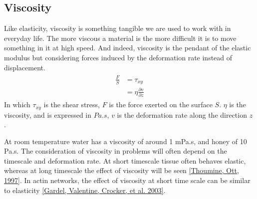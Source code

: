 \documentclass[A4paperpaper,11pt,english]{sphinxmanual}
\begin{document}
\subsection{Viscosity}
\label{index-latex:viscosity}
Like elasticity, viscosity is something tangible we are used to work with in
everyday life. The more viscous a material is the more difficult it is to move
something in it at high speed. And indeed, viscosity is the pendant of the elastic
modulus but considering forces induced by the deformation rate instead of displacement.
\label{index-latex:equation-eqa12}\begin{gather}
\begin{split}\frac{F}{S} &= \tau_{xy} \\
            &= \eta \frac{\partial v}{\partial z}\end{split}\label{index-latex-eqa12}
\end{gather}
In which \(\tau_{xy}\) is the shear stress, \(F\) is the force exerted
on the surface \(S\). \(\eta\) is the viscosity, and is expressed in
\(Pa.s\), \(v\) is the deformation rate along the direction \(z\) .

At room temperature water has a viscosity of around 1 mPa.s, and honey of 10 Pa.s. The consideration of viscosity in problems will
often depend on the timescale and deformation rate. At short
timescale tissue often behaves elastic, whereas at long timescale the effect
of viscosity will be seen {\hyperref[index-latex:thoumine1997]{{[}Thoumine, Ott,  1997{]}}}. In actin networks, the effect of
viscosity at short time scale can be similar to elasticity {\hyperref[index-latex:gardel2003]{{[}Gardel, Valentine, Crocker,  et al.  2003{]}}}.
\end{document}
